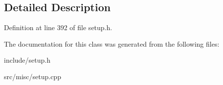 \subsection{Detailed Description}


Definition at line 392 of file setup.\-h.



The documentation for this class was generated from the following files\-:\begin{DoxyCompactItemize}
\item 
include/setup.\-h\item 
src/misc/setup.\-cpp\end{DoxyCompactItemize}
